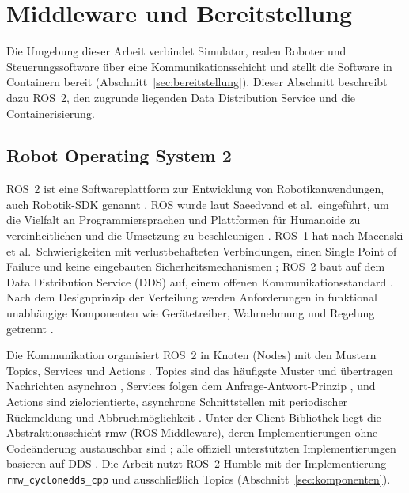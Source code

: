 \section{Middleware und Bereitstellung}
\label{sec:middleware}
Die Umgebung dieser Arbeit verbindet Simulator, realen Roboter und Steuerungssoftware über eine Kommunikationsschicht und stellt die Software in Containern bereit (Abschnitt~\ref{sec:bereitstellung}).
Dieser Abschnitt beschreibt dazu ROS~2, den zugrunde liegenden Data Distribution Service und die Containerisierung.

\subsection{Robot Operating System 2}
\label{sec:ros2}
ROS~2 ist eine Softwareplattform zur Entwicklung von Robotikanwendungen, auch Robotik-SDK genannt \cite{Macenski2022}.
ROS wurde laut Saeedvand et al.\ eingeführt, um die Vielfalt an Programmiersprachen und Plattformen für Humanoide zu vereinheitlichen und die Umsetzung zu beschleunigen \cite{Saeedvand2019}.
ROS~1 hat nach Macenski et al.\ Schwierigkeiten mit verlustbehafteten Verbindungen, einen Single Point of Failure und keine eingebauten Sicherheitsmechanismen \cite{Macenski2022}; ROS~2 baut auf dem Data Distribution Service (DDS) auf, einem offenen Kommunikationsstandard \cite{Macenski2022}.
Nach dem Designprinzip der Verteilung werden Anforderungen in funktional unabhängige Komponenten wie Gerätetreiber, Wahrnehmung und Regelung getrennt \cite{Macenski2022}.

Die Kommunikation organisiert ROS~2 in Knoten (Nodes) mit den Mustern Topics, Services und Actions \cite{Macenski2022}.
Topics sind das häufigste Muster und übertragen Nachrichten asynchron \cite{Macenski2022}, Services folgen dem Anfrage-Antwort-Prinzip \cite{Macenski2022}, und Actions sind zielorientierte, asynchrone Schnittstellen mit periodischer Rückmeldung und Abbruchmöglichkeit \cite{Macenski2022}.
Unter der Client-Bibliothek liegt die Abstraktionsschicht rmw (ROS Middleware), deren Implementierungen ohne Codeänderung austauschbar sind \cite{Macenski2022}; alle offiziell unterstützten Implementierungen basieren auf DDS \cite{Macenski2022}.
Die Arbeit nutzt ROS~2 Humble mit der Implementierung \texttt{rmw\_cyclonedds\_cpp} und ausschließlich Topics (Abschnitt~\ref{sec:komponenten}).


